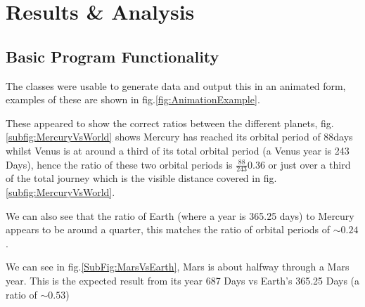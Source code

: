 \documentclass{article}
\begin{document}
    \section{Results \& Analysis}
        \subsection{Basic Program Functionality}
                The classes were usable to generate data and output this in an animated form, 
                examples of these are shown in fig.\ref{fig:AnimationExample}.
                \par
                These appeared to show the correct ratios between the different planets, 
                fig.\ref{subfig:MercuryVsWorld} shows Mercury has reached its orbital period of 
                 88days\cite{PlanetDat} whilst Venus is at around a third of its total orbital 
                 period (a Venus year is 243 Days\cite{PlanetDat}), hence the ratio of these two 
                 orbital periods is $\frac{88}{243} 0.36$ or just over a third of the total 
                 journey which is the visible distance covered in fig.\ref{subfig:MercuryVsWorld}. 
                 \par
                 We can also see that the ratio of Earth (where a year is 365.25 days) to Mercury 
                 appears to be around a quarter, this matches the ratio of orbital periods of 
                 $\sim 0.24$.
                \par
                We can see in fig.\ref{SubFig:MarsVsEarth}, Mars is about halfway through a Mars 
                year. This is the expected result from its year 687 Days vs Earth's 365.25 Days
                 (a ratio of $\sim 0.53$) \cite{MarsEarthData}
\end{document}
